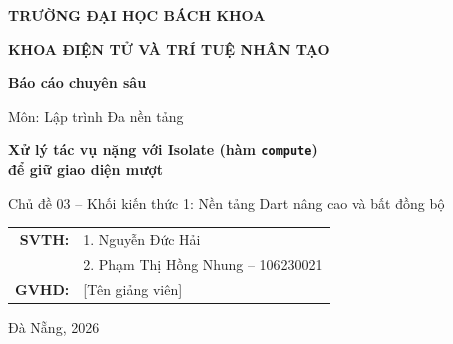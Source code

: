 \documentclass[aspectratio=169,11pt]{beamer}
\begin{document}
\begin{frame}[plain]
  \begin{center}
    {\large\bfseries TRƯỜNG ĐẠI HỌC BÁCH KHOA\par}
    {\normalsize\bfseries KHOA ĐIỆN TỬ VÀ TRÍ TUỆ NHÂN TẠO\par}
  \end{center}
  \vspace{0.35cm}
  \hspace*{0.5cm}
  \begin{minipage}{0.9\textwidth}
    {\footnotesize\textbf{Báo cáo chuyên sâu}\par}
    {\footnotesize Môn: Lập trình Đa nền tảng\par}
  \end{minipage}
  \vspace{0.45cm}
  \begin{center}
    {\Large\bfseries Xử lý tác vụ nặng với Isolate (hàm \texttt{compute})\\ để giữ giao diện mượt\par}
    \vspace{0.2cm}
    {\footnotesize\color{grayD} Chủ đề 03 -- Khối kiến thức 1: Nền tảng Dart nâng cao và bất đồng bộ\par}
  \end{center}
  \vspace{0.35cm}
  \begin{flushright}
    \begin{tabular}{r l}
      \textbf{SVTH:} & 1. Nguyễn Đức Hải \\
                     & 2. Phạm Thị Hồng Nhung -- 106230021 \\
      \textbf{GVHD:} & [Tên giảng viên]
    \end{tabular}
    \hspace*{0.6cm}
  \end{flushright}
  \vfill
  \begin{center}
    {\footnotesize Đà Nẵng, 2026\par}
  \end{center}
\end{frame}
\end{document}
